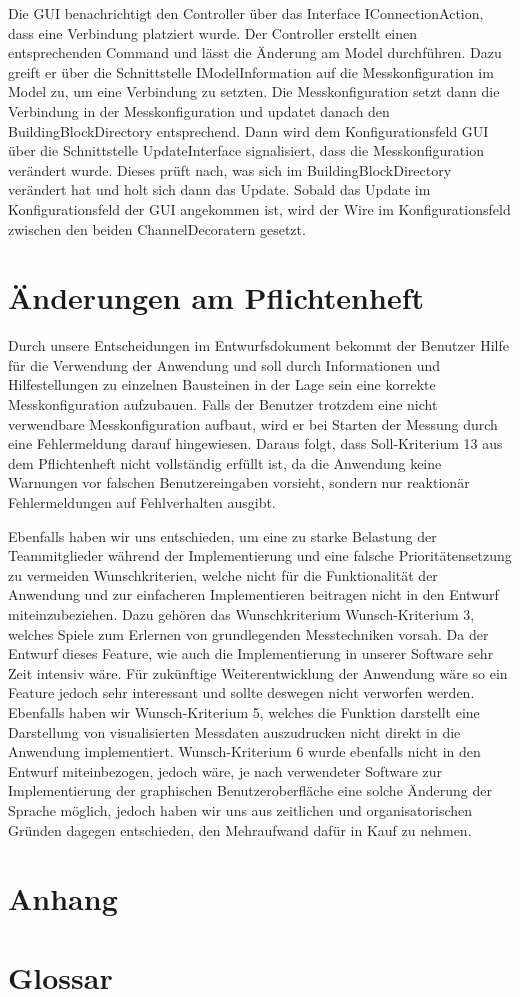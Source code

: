 \documentclass[parskip=full]{scrartcl}
\begin{document}
Die GUI benachrichtigt den Controller über das Interface IConnectionAction, dass eine Verbindung platziert wurde. Der Controller erstellt einen entsprechenden Command und lässt die Änderung am Model durchführen. Dazu greift er über die Schnittstelle IModelInformation auf die Messkonfiguration im Model zu, um eine Verbindung zu setzten. Die Messkonfiguration setzt dann die Verbindung in der Messkonfiguration und updatet danach den BuildingBlockDirectory entsprechend. Dann wird dem Konfigurationsfeld GUI über die Schnittstelle UpdateInterface signalisiert, dass die Messkonfiguration verändert wurde. Dieses prüft nach, was sich im BuildingBlockDirectory verändert hat und holt sich dann das Update. Sobald das Update im Konfigurationsfeld der GUI angekommen ist, wird der Wire im Konfigurationsfeld zwischen den beiden ChannelDecoratern gesetzt.


\clearpage
\section{Änderungen am Pflichtenheft}

Durch unsere Entscheidungen im Entwurfsdokument bekommt der Benutzer Hilfe für die Verwendung der Anwendung und soll durch Informationen und Hilfestellungen zu einzelnen Bausteinen in der Lage sein eine korrekte Messkonfiguration aufzubauen.
Falls der Benutzer trotzdem eine nicht verwendbare Messkonfiguration aufbaut, wird er bei Starten der Messung durch eine Fehlermeldung darauf hingewiesen.
Daraus folgt, dass Soll-Kriterium 13 aus dem Pflichtenheft nicht vollständig erfüllt ist, da die Anwendung keine Warnungen vor falschen Benutzereingaben vorsieht, sondern nur reaktionär Fehlermeldungen auf Fehlverhalten ausgibt.

Ebenfalls haben wir uns entschieden, um eine zu starke Belastung der Teammitglieder während der Implementierung und eine falsche Prioritätensetzung zu vermeiden Wunschkriterien, welche nicht für die Funktionalität der Anwendung und zur einfacheren Implementieren beitragen nicht in den Entwurf miteinzubeziehen. 
Dazu gehören das Wunschkriterium Wunsch-Kriterium 3, welches Spiele zum Erlernen von grundlegenden Messtechniken vorsah. Da der Entwurf dieses Feature, wie auch die Implementierung in unserer Software sehr Zeit intensiv wäre. Für zukünftige Weiterentwicklung der Anwendung wäre so ein Feature jedoch sehr interessant und sollte deswegen nicht verworfen werden.
Ebenfalls haben wir Wunsch-Kriterium 5, welches die Funktion darstellt eine Darstellung von visualisierten Messdaten auszudrucken nicht direkt in die Anwendung implementiert. 
Wunsch-Kriterium 6 wurde ebenfalls nicht in den Entwurf miteinbezogen, jedoch wäre, je nach verwendeter Software zur Implementierung der graphischen Benutzeroberfläche eine solche Änderung der Sprache möglich, jedoch haben wir uns aus zeitlichen und organisatorischen Gründen dagegen entschieden, den Mehraufwand dafür in Kauf zu nehmen.

\clearpage
\section{Anhang}


\clearpage
\section{Glossar}\label{glossar}

\renewcommand*{\glossarysection}[2][]{}	%
\printnoidxglossaries				%
\end{document}
